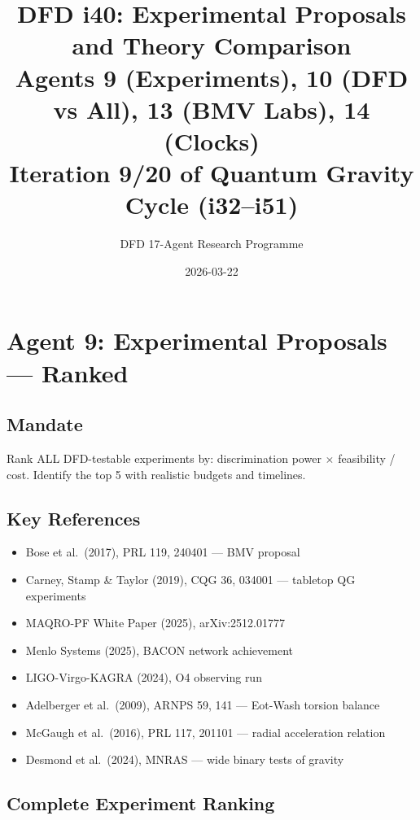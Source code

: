 \documentclass[11pt,a4paper]{article}
\title{DFD i40: Experimental Proposals and Theory Comparison\\[6pt]
\large Agents 9 (Experiments), 10 (DFD vs All), 13 (BMV Labs), 14 (Clocks)\\[6pt]
\normalsize Iteration 9/20 of Quantum Gravity Cycle (i32--i51)}
\author{DFD 17-Agent Research Programme}
\date{2026-03-22}
\begin{document}
\maketitle
\tableofcontents
\newpage

\section{Agent 9: Experimental Proposals --- Ranked}
\label{sec:agent9}

\subsection{Mandate}

Rank ALL DFD-testable experiments by: discrimination power $\times$ feasibility / cost. Identify the top 5 with realistic budgets and timelines.

\subsection{Key References}

\begin{itemize}
\item Bose et al.\ (2017), PRL 119, 240401 --- BMV proposal
\item Carney, Stamp \& Taylor (2019), CQG 36, 034001 --- tabletop QG experiments
\item MAQRO-PF White Paper (2025), arXiv:2512.01777
\item Menlo Systems (2025), BACON network achievement
\item LIGO-Virgo-KAGRA (2024), O4 observing run
\item Adelberger et al.\ (2009), ARNPS 59, 141 --- Eot-Wash torsion balance
\item McGaugh et al.\ (2016), PRL 117, 201101 --- radial acceleration relation
\item Desmond et al.\ (2024), MNRAS --- wide binary tests of gravity
\end{itemize}

\subsection{Complete Experiment Ranking}
\end{document}
